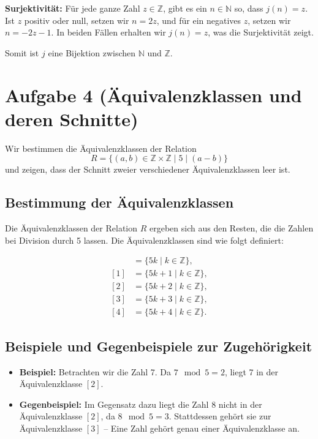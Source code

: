 \documentclass[12pt]{article}
\begin{document}
\textbf{Surjektivität:} Für jede ganze Zahl \( z \in \mathbb{Z} \), gibt es ein \( n \in \mathbb{N} \) so, dass \( j(n) = z \). Ist \( z \) positiv oder null, setzen wir \( n = 2z \), und für ein negatives \( z \), setzen wir \( n = -2z - 1 \). In beiden Fällen erhalten wir \( j(n) = z \), was die Surjektivität zeigt.

Somit ist \( j \) eine Bijektion zwischen \( \mathbb{N} \) und \( \mathbb{Z} \).

\section*{Aufgabe 4 (Äquivalenzklassen und deren Schnitte)}

Wir bestimmen die Äquivalenzklassen der Relation \[ R = \{ (a,b) \in \mathbb{Z} \times \mathbb{Z} \mid 5 \mid (a - b) \} \] und zeigen, dass der Schnitt zweier verschiedener Äquivalenzklassen leer ist.

\subsection*{Bestimmung der Äquivalenzklassen}

Die Äquivalenzklassen der Relation \( R \) ergeben sich aus den Resten, die die Zahlen bei Division durch 5 lassen. Die Äquivalenzklassen sind wie folgt definiert:

\begin{align*}
	[0] & = \{ 5k \mid k \in \mathbb{Z} \},     \\
	[1] & = \{ 5k + 1 \mid k \in \mathbb{Z} \}, \\
	[2] & = \{ 5k + 2 \mid k \in \mathbb{Z} \}, \\
	[3] & = \{ 5k + 3 \mid k \in \mathbb{Z} \}, \\
	[4] & = \{ 5k + 4 \mid k \in \mathbb{Z} \}.
\end{align*}


\subsection*{Beispiele und Gegenbeispiele zur Zugehörigkeit}

\begin{itemize}
	\item \textbf{Beispiel:} Betrachten wir die Zahl 7. Da \( 7 \mod 5 = 2 \), liegt 7 in der Äquivalenzklasse \( [2] \).
	\item \textbf{Gegenbeispiel:} Im Gegensatz dazu liegt die Zahl 8 nicht in der Äquivalenzklasse \( [2] \), da \( 8 \mod 5 = 3 \). Stattdessen gehört sie zur Äquivalenzklasse \( [3] \) -- Eine Zahl gehört genau einer Äquivalenzklasse an.
\end{itemize}
\end{document}
